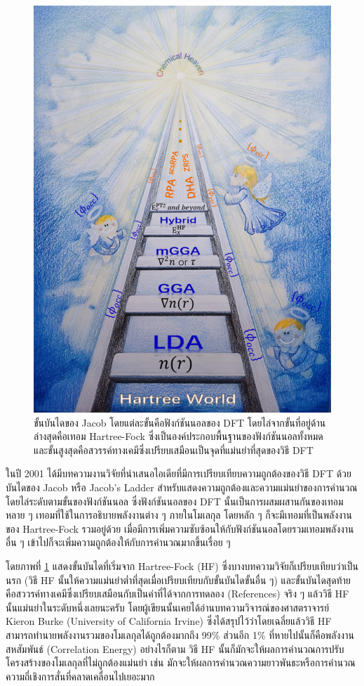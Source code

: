 \begin{figure}[H]
    \centering
    \includegraphics[width=0.7\linewidth]{fig/jacob_ladder.jpg}
    \caption{ขั้นบันไดของ Jacob โดยแต่ละขั้นคือฟังก์ชันนอลของ DFT โดยไล่จากขั้นที่อยู่ด้านล่างสุดคือเทอม Hartree-Fock ซึ่งเป็นองค์ประกอบพื้นฐานของฟังก์ชันนอลทั้งหมดและขั้นสูงสุดคือสวรรค์ทางเคมีซึ่งเปรียบเสมือนเป็นจุดที่แม่นยำที่สุดของวิธี DFT}
    \label{fig:jacob_ladder}
\end{figure}

ในปี 2001 ได้มีบทความงานวิจัยที่นำเสนอไอเดียที่มีการเปรียบเทียบความถูกต้องของวิธี DFT ด้วยบันไดของ Jacob หรือ Jacob's Ladder สำหรับแสดงความถูกต้องและความแม่นยำของการคำนวณโดยไล่ระดับตามขั้นของฟังก์ชันนอล\autocite{perdew2001} ซึ่งฟังก์ชันนอลของ DFT นั้นเป็นการผสมผสานกันของเทอมหลาย ๆ เทอมที่ใช้ในการอธิบายพลังงานต่าง ๆ ภายในโมเลกุล โดยหลัก ๆ ก็จะมีเทอมที่เป็นพลังงานของ Hartree-Fock รวมอยู่ด้วย เมื่อมีการเพิ่มความซับซ้อนให้กับฟังก์ชันนอลโดยรวมเทอมพลังงานอื่น ๆ เข้าไปก็จะเพิ่มความถูกต้องให้กับการคำนวณมากขึ้นเรื่อย ๆ

โดยภาพที่ \ref{fig:jacob_ladder} แสดงขั้นบันไดที่เริ่มจาก Hartree-Fock (HF) ซึ่งบางบทความวิจัยก็เปรียบเทียบว่าเป็นนรก (วิธี HF นั้นให้ความแม่นยำต่ำที่สุดเมื่อเปรียบเทียบกับขั้นบันไดขั้นอื่น ๆ) และขั้นบันไดสุดท้ายคือสววรค์ทางเคมีซึ่งเปรียบเสมือนกับเป็นค่าที่ได้จากการทดลอง (References) จริง ๆ แล้ววิธี HF นั้นแม่นยำในระดับหนึ่งเลยนะครับ โดยผู้เขียนนั้นเคยได้อ่านบทความวิจารณ์ของศาสตราจารย์ Kieron Burke (University of California Irvine) ซึ่งได้สรุปไว้ว่าโดยเฉลี่ยแล้ววิธี HF สามารถทำนายพลังงานรวมของโมเลกุลได้ถูกต้องมากถึง 99\% ส่วนอีก 1\% ที่หายไปนั้นก็คือพลังงานสหสัมพันธ์ (Correlation Energy) อย่างไรก็ตาม วิธี HF นั้นก็มักจะให้ผลการคำนวณการปรับโครงสร้างของโมเลกุลที่ไม่ถูกต้องแม่นยำ เช่น มักจะให้ผลการคำนวณความยาวพันธะหรือการคำนวณความถี่เชิงการสั่นที่คลาดเคลื่อนไปเยอะมาก

